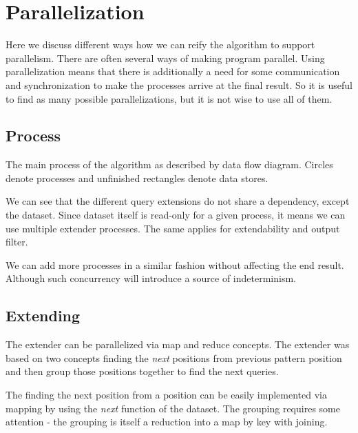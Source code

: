 \chapter{Parallelization}
\label{c:parallelization}

Here we discuss different ways how we can reify the algorithm to support parallelism. There are often several ways of making program parallel. Using parallelization means that there is additionally a need for some communication and synchronization to make the processes arrive at the final result. So it is useful to find as many possible parallelizations, but it is not wise to use all of them.

\section{Process}

The main process of the algorithm as described by data flow diagram.\cite{Kahn74,Lee95} Circles denote processes and unfinished rectangles denote data stores.

\begin{figure}[H]
	\scalebox{0.8}{}
\end{figure}

We can see that the different query extensions do not share a dependency, except the dataset. Since dataset itself is read-only for a given process, it means we can use multiple extender processes. The same applies for extendability and output filter.

\begin{figure}[H]
  \scalebox{0.8}{}
\end{figure}

We can add more processes in a similar fashion without affecting the end result. Although such concurrency will introduce a source of indeterminism.

\section{Extending}

The extender can be parallelized via map and reduce concepts\cite{MapReduce,SteeleFold}. The extender was based on two concepts finding the \emph{next} positions from previous pattern position and then group those positions together to find the next queries.

The finding the next position from a position can be easily implemented via mapping by using the \emph{next} function of the dataset. The grouping requires some attention - the grouping is itself a reduction into a map by key with joining.

